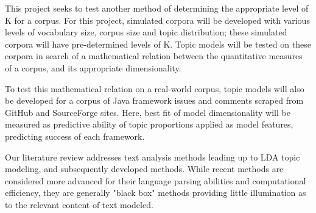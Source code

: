 \documentclass[11pt]{article}
\begin{document}
This project seeks to test another method of determining the appropriate level of K for a corpus. For this project, simulated corpora will be developed with various levels of vocabulary size, corpus size and topic distribution; these simulated corpora will have pre-determined levels of K. Topic models will be tested on these corpora in search of a mathematical relation between the quantitative measures of a corpus, and its appropriate dimensionality. 

To test this mathematical relation on a real-world corpus, topic models will also be developed for a corpus of Java framework issues and comments scraped from GitHub and SourceForge sites. Here, best fit of model dimensionality will be measured as predictive ability of topic proportions applied as model features, predicting success of each framework.   

Our literature review addresses text analysis methods leading up to LDA topic modeling, and subsequently developed methods. While recent methods are considered more advanced for their language parsing abilities and computational efficiency, they are generally "black box" methods providing little illumination as to the relevant content of text modeled.   
\end{document}
